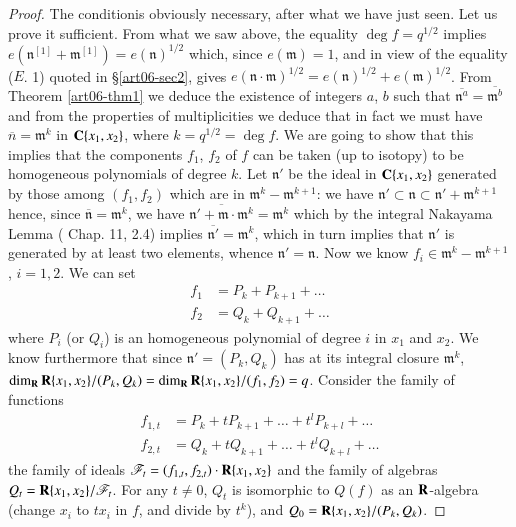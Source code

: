\begin{proof}
The condition\pageoriginale is obviously necessary, after what we have just seen. Let us prove it sufficient. From what we saw above, the equality $\deg f = q^{1/2}$ implies $e(\mathfrak{n}^{[1]} + \mathfrak{m}^{[1]}) = e(\mathfrak{n})^{1/2}$ which, since $e(\mathfrak{m}) =1$, and in view of the equality ($E$. 1) quoted in \S \ref{art06-sec2}, gives $e(\mathfrak{n} \cdot \mathfrak{m})^{1/2} = e(\mathfrak{n})^{1/2}+ e(\mathfrak{m})^{1/2}$. From Theorem \ref{art06-thm1} we deduce the existence of integers $a$, $b$ such that $\overline{\mathfrak{n}^a} = \overline{\mathfrak{m}^b}$ and from the properties of multiplicities we deduce that in fact we must have $\overline{n} = \mathfrak{m}^k$ in $\mathbf{C} \{x_1, x_2\}$, where $k = q^{1/2} = \deg f$. We are going to show that this implies that the components $f_1$, $f_2$ of $f$ can be taken (up to isotopy) to be homogeneous polynomials of degree $k$. Let $\mathfrak{n}'$ be the ideal in $\mathbf{C}\{x_1, x_2\}$ generated by those among $(f_1, f_2)$ which are in $\mathfrak{m}^k - \mathfrak{m}^{k+1}$: we have $\mathfrak{n}' \subset \mathfrak{n} \subset \mathfrak{n}' + \mathfrak{m}^{k+1}$ hence, since $\overline{\mathfrak{n}} = \mathfrak{m}^k$, we have $\overline{\mathfrak{n}' + \mathfrak{m} \cdot \mathfrak{m}^k} = \mathfrak{m}^k$ which by the integral Nakayama Lemma (\cite{art06-keyC.E.W.} Chap. 11, 2.4)  implies $\overline{\mathfrak{n}'} = \mathfrak{m}^k$, which in turn implies that $\mathfrak{n}'$ is generated by at least two elements, whence $\mathfrak{n}' =\mathfrak{n}$. Now we know $f_i \in \mathfrak{m}^k - \mathfrak{m}^{k+1}$, $i =1,2$. We can set 
\begin{align*}
f_1 & = P_k + P_{k+1} + \ldots \\
f_2 & = Q_k + Q_{k+1} + \ldots 
\end{align*}
where $P_i$ (or $Q_i$) is an homogeneous polynomial of degree $i$ in $x_1$ and $x_2$. We know furthermore that since $\mathfrak{n}' = (P_k, Q_k)$ has at its integral closure $\mathfrak{m}^k$, $\dim_{\mathbf{R}} \mathbf{R} \{x_1, x_2\} / (P_k, Q_k) = \dim_{\mathbf{R}} \mathbf{R} \{x_1, x_2\}/ (f_1, f_2) = q$. Consider the family of functions
\begin{align*}
f_{1,t} & = P_k + t P_{k+1} + \ldots + t^l P_{k+l} + \ldots \\
f_{2,t} & = Q_k + t Q_{k+1} + \ldots + t^l Q_{k+l} + \ldots 
\end{align*} 
the family of ideals $\mathscr{F}_t = (f_{1,t}, f_{2,t}) \cdot \mathbf{R} \{x_1, x_2\}$ and the family of algebras $Q_t = \mathbf{R} \{x_1, x_2\} / \mathscr{F}_t$. For any $t \neq 0$, $Q_t$ is isomorphic to $Q(f)$ as an $\mathbf{R}$-algebra (change $x_i$ to $tx_i$ in $f$, and divide by $t^k$), and $Q_0= \mathbf{R} \{x_1, x_2\} / (P_k, Q_k)$.


\end{proof}
